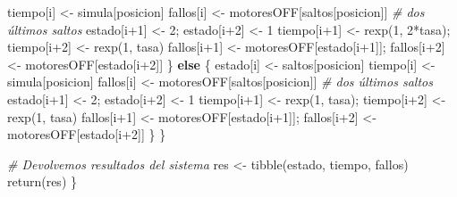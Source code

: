 \documentclass[
]{book}
\newenvironment{Shaded}{\begin{snugshade}}{\end{snugshade}}
\newcommand{\CommentTok}[1]{\textcolor[rgb]{0.56,0.35,0.01}{\textit{#1}}}
\newcommand{\ControlFlowTok}[1]{\textcolor[rgb]{0.13,0.29,0.53}{\textbf{#1}}}
\newcommand{\DecValTok}[1]{\textcolor[rgb]{0.00,0.00,0.81}{#1}}
\newcommand{\FunctionTok}[1]{\textcolor[rgb]{0.00,0.00,0.00}{#1}}
\newcommand{\NormalTok}[1]{#1}
\newcommand{\OtherTok}[1]{\textcolor[rgb]{0.56,0.35,0.01}{#1}}
\newcommand{\SpecialCharTok}[1]{\textcolor[rgb]{0.00,0.00,0.00}{#1}}
\theoremstyle{definition}
\theoremstyle{definition}
\theoremstyle{definition}
\theoremstyle{definition}
\theoremstyle{remark}
\begin{document}
\begin{Shaded}
\begin{Highlighting}[]
\NormalTok{      tiempo[i] }\OtherTok{\textless{}{-}}\NormalTok{ simula[posicion] }
\NormalTok{      fallos[i] }\OtherTok{\textless{}{-}}\NormalTok{ motoresOFF[saltos[posicion]]}
      \CommentTok{\# dos últimos saltos}
\NormalTok{      estado[i}\SpecialCharTok{+}\DecValTok{1}\NormalTok{] }\OtherTok{\textless{}{-}} \DecValTok{2}\NormalTok{; estado[i}\SpecialCharTok{+}\DecValTok{2}\NormalTok{] }\OtherTok{\textless{}{-}} \DecValTok{1}
\NormalTok{      tiempo[i}\SpecialCharTok{+}\DecValTok{1}\NormalTok{] }\OtherTok{\textless{}{-}} \FunctionTok{rexp}\NormalTok{(}\DecValTok{1}\NormalTok{, }\DecValTok{2}\SpecialCharTok{*}\NormalTok{tasa); tiempo[i}\SpecialCharTok{+}\DecValTok{2}\NormalTok{] }\OtherTok{\textless{}{-}} \FunctionTok{rexp}\NormalTok{(}\DecValTok{1}\NormalTok{, tasa)}
\NormalTok{      fallos[i}\SpecialCharTok{+}\DecValTok{1}\NormalTok{] }\OtherTok{\textless{}{-}}\NormalTok{ motoresOFF[estado[i}\SpecialCharTok{+}\DecValTok{1}\NormalTok{]]; fallos[i}\SpecialCharTok{+}\DecValTok{2}\NormalTok{] }\OtherTok{\textless{}{-}}\NormalTok{ motoresOFF[estado[i}\SpecialCharTok{+}\DecValTok{2}\NormalTok{]]}
\NormalTok{    \}}
    \ControlFlowTok{else}
\NormalTok{    \{}
\NormalTok{      estado[i] }\OtherTok{\textless{}{-}}\NormalTok{ saltos[posicion]}
\NormalTok{      tiempo[i] }\OtherTok{\textless{}{-}}\NormalTok{ simula[posicion] }
\NormalTok{      fallos[i] }\OtherTok{\textless{}{-}}\NormalTok{ motoresOFF[saltos[posicion]]  }
      \CommentTok{\# dos últimos saltos}
\NormalTok{      estado[i}\SpecialCharTok{+}\DecValTok{1}\NormalTok{] }\OtherTok{\textless{}{-}} \DecValTok{2}\NormalTok{; estado[i}\SpecialCharTok{+}\DecValTok{2}\NormalTok{] }\OtherTok{\textless{}{-}} \DecValTok{1}
\NormalTok{      tiempo[i}\SpecialCharTok{+}\DecValTok{1}\NormalTok{] }\OtherTok{\textless{}{-}} \FunctionTok{rexp}\NormalTok{(}\DecValTok{1}\NormalTok{, tasa); tiempo[i}\SpecialCharTok{+}\DecValTok{2}\NormalTok{] }\OtherTok{\textless{}{-}} \FunctionTok{rexp}\NormalTok{(}\DecValTok{1}\NormalTok{, tasa)}
\NormalTok{      fallos[i}\SpecialCharTok{+}\DecValTok{1}\NormalTok{] }\OtherTok{\textless{}{-}}\NormalTok{ motoresOFF[estado[i}\SpecialCharTok{+}\DecValTok{1}\NormalTok{]]; fallos[i}\SpecialCharTok{+}\DecValTok{2}\NormalTok{] }\OtherTok{\textless{}{-}}\NormalTok{ motoresOFF[estado[i}\SpecialCharTok{+}\DecValTok{2}\NormalTok{]]}
\NormalTok{    \}    }
\NormalTok{  \}}

  \CommentTok{\# Devolvemos resultados del sistema }
\NormalTok{  res }\OtherTok{\textless{}{-}} \FunctionTok{tibble}\NormalTok{(estado, tiempo, fallos)}
  \FunctionTok{return}\NormalTok{(res)}
\NormalTok{\}}
\end{Highlighting}
\end{Shaded}
\end{document}
